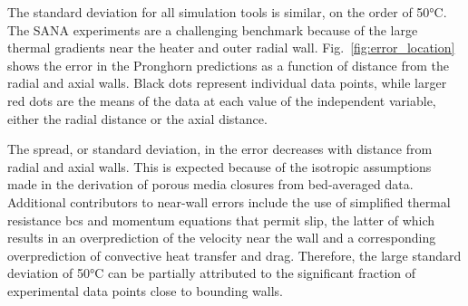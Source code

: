 The standard deviation for all simulation tools is similar, on the order of 50\si{\celsius}. The SANA experiments are a challenging benchmark because of the large thermal gradients near the heater and outer radial wall. Fig.\ \ref{fig:error_location} shows the error in the Pronghorn predictions as a function of distance from the radial and axial walls. Black dots represent individual data points, while larger red dots are the means of the data at each value of the independent variable, either the radial distance or the axial distance. 

The spread, or standard deviation, in the error decreases with distance from radial and axial walls. This is expected because of the isotropic assumptions made in the derivation of porous media closures from bed-averaged data. Additional contributors to near-wall errors include the use of simplified thermal resistance \glspl{bc} and momentum equations that permit slip, the latter of which results in an overprediction of the velocity near the wall and a corresponding overprediction of convective heat transfer and drag. Therefore, the large standard deviation of 50\si{\celsius} can be partially attributed to the significant fraction of experimental data points close to bounding walls. 

